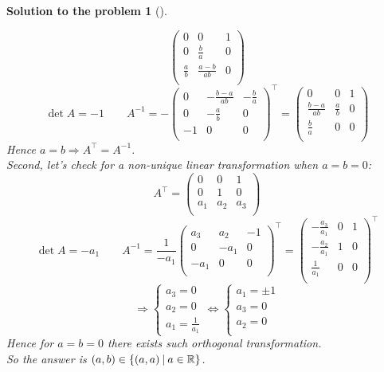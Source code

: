 \documentclass[12pt,a4]{article}
\newtheorem{solution}{Solution to the problem}
\begin{document}
\begin{solution}[]
\begin{enumerate}[(a)]
\[\begin{pmatrix}
0 &  0 & 1 \\
0  & \frac{b}{a} & 0 \\
\frac{a}{b}  & \frac{a-b}{ab} & 0 \\
\end{pmatrix} 
\]
\[
\det A = -1 \qquad A^{-1} = - \begin{pmatrix}
 0 &  -\frac{b-a}{ab} & -\frac{b}{a} \\
 0  & -\frac{a}{b}    & 0 \\
-1  &  0              & 0 \\
\end{pmatrix}^\top = \begin{pmatrix}
0 &  0 & 1 \\
\frac{b-a}{ab}  & \frac{a}{b} & 0 \\
\frac{b}{a}  & 0 & 0 \\
\end{pmatrix} 
\]
Hence $a = b \Rightarrow A^\top = A^{-1}$. \\
Second, let's check for a non-unique linear transformation when $a = b = 0$:
\[
A^\top = \begin{pmatrix}
0 & 0 & 1\\
0 & 1 & 0\\
a_1 & a_2 & a_3\\
\end{pmatrix}
\]
\[
\det A = -a_1 \qquad  A^{-1} = \frac{1}{-a_1} \begin{pmatrix}
a_3 & a_2 & -1\\
0 & -a_1 & 0\\
-a_1 & 0 & 0\\
\end{pmatrix}^\top = \begin{pmatrix}
-\frac{a_3}{a_1} & 0 & 1\\
-\frac{a_2}{a_1} & 1 & 0\\
 \frac{1}{a_1}   & 0 & 0\\
\end{pmatrix}^\top
\]
\[
\Rightarrow 
\left\{\begin{matrix}
a_3 = 0 \\ 
a_2 = 0 \\
a_1 = \frac{1}{a_1}
\end{matrix}\right.
\Leftrightarrow 
\left\{\begin{matrix}
a_1 = \pm 1 \\
a_3 = 0 \\ 
a_2 = 0 \\
\end{matrix}\right.
\]
Hence for $a = b = 0$ there exists such orthogonal transformation. \\
So the answer is $(a,b) \in \{(a,a)~\vline~a \in\mathbb{R}\}$.
\end{enumerate}
\end{solution}
\end{document}
